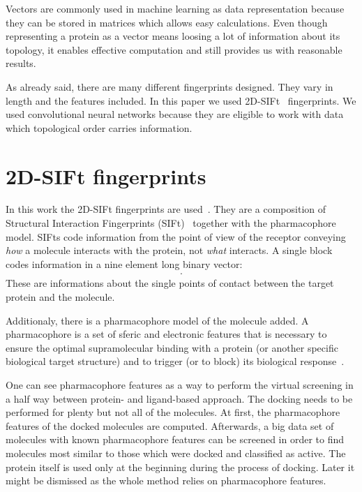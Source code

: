 \documentclass[a4paper,10pt]{report}
\begin{document}
    Vectors are commonly used in machine learning as data representation because they can be stored in matrices which allows easy calculations. Even though representing a protein as a vector means loosing a lot of information about its topology, it enables effective computation and still provides us with reasonable results. 
    
    As already said, there are many different fingerprints designed. They vary in length and the features included. In this paper we used 2D-SIFt~\cite{2DSIFT} fingerprints. We used convolutional neural networks because they are eligible to work with data which topological order carries information.
     
     
    \section{2D-SIFt fingerprints}
    In this work the 2D-SIFt fingerprints are used~\cite{Mordalski2011, cos-jeszcze}. They are a composition of Structural Interaction Fingerprints (SIFt)~\cite{Singh2006} together with the pharmacophore model. SIFts code information from the point of view of the receptor conveying \textit{how} a molecule interacts with the protein, not \textit{what} interacts. A single block codes information in a nine element long binary vector:
    \begin{align*}
    [\text{any contact},&\text{backbone},\text{sidechain},\text{polar},\text{hydrophobic}, \\
    &\text{H-bond acceptor},\text{H-bond donor},\text{aromatic},\text{charged}
    ].
    \end{align*}
    These are informations about the single points of contact between the target protein and the molecule.
    
    Additionaly, there is a pharmacophore model of the molecule added. A pharmacophore is a set of sferic and electronic features that is necessary to ensure the optimal supramolecular binding with a protein (or another specific biological target structure) and to trigger (or to block) its biological response~\cite{GLOSSARY}.
    
    One can see pharmacophore features as a way to perform the virtual screening in a half way between protein- and ligand-based approach. The docking needs to be performed for plenty but not all of the molecules. At first, the pharmacophore features of the docked molecules are computed. Afterwards, a big data set of molecules with known pharmacophore features can be screened in order to find molecules most similar to those which were docked and classified as active. The protein itself is used only at the beginning during the process of docking. Later it might be dismissed as the whole method relies on pharmacophore features.
    
\end{document}
